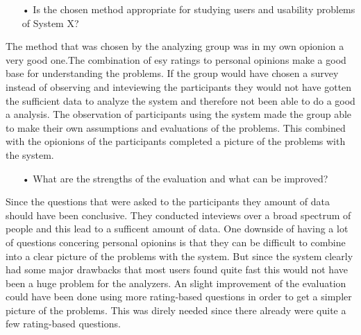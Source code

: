 \documentclass[11pt,a4paper]{article}
\begin{document}
\begin{enumerate}
\item[•]Is the chosen method appropriate for studying users and usability problems of System X? 
\end{enumerate}

The method that was chosen by the analyzing group was in my own opionion a very good one.The combination of esy ratings to personal opinions make a good base for understanding the problems. If the group would have chosen a survey instead of observing and inteviewing the participants they would not have gotten the sufficient data to analyze the system and therefore not been able to do a good a analysis. The observation of participants using the system made the group able to make their own assumptions and evaluations of the problems. This combined with the opionions of the participants completed a picture of the problems with the system. 

\begin{enumerate}
\item[•]What are the strengths of the evaluation and what can be improved? 
\end{enumerate}

Since the questions that were asked to the participants they amount of data should have been conclusive. They conducted inteviews over a broad spectrum of people and this lead to a sufficent amount of data. One downside of having a lot of questions concering personal opionins is that they can be difficult to combine into a clear picture of the problems with the system. But since the system clearly had some major drawbacks that most users found quite fast this would not have been a huge problem for the analyzers.
	An slight improvement of the evaluation could have been done using more rating-based questions in order to get a simpler picture of the problems. This was direly needed since there already were quite a few rating-based questions. 
\end{document}
